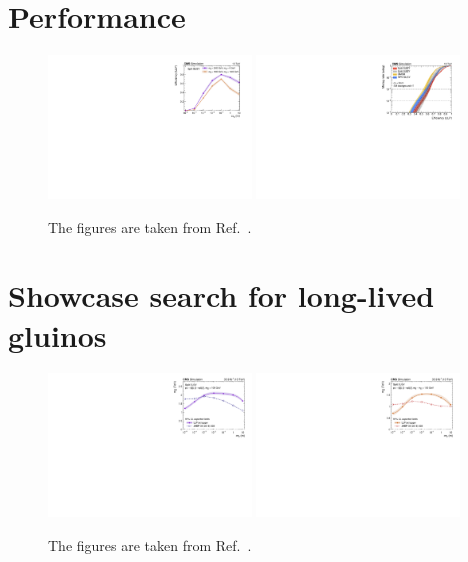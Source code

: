 \documentclass{webofc}
\begin{document}
\section{Performance}
\label{peformance}

\begin{figure}[!ht]
\includegraphics[width=0.48\textwidth]{figs/ctau.pdf}\hspace{0.03\textwidth}
\includegraphics[width=0.48\textwidth]{figs/roc_1.pdf}
\centering
\caption{The figures are taken from Ref.~\cite{CMS-EXO-19-011}.}
\label{fig-3}
\end{figure}

\section{Showcase search for long-lived gluinos}
\label{showcase}

\begin{figure}[!ht]
\includegraphics[width=0.48\textwidth]{figs/summaryU.pdf}\hspace{0.03\textwidth}
\includegraphics[width=0.48\textwidth]{figs/summaryC.pdf}
\centering
\caption{The figures are taken from Ref.~\cite{CMS-EXO-19-011}.}
\label{fig-4}
\end{figure}
\end{document}
